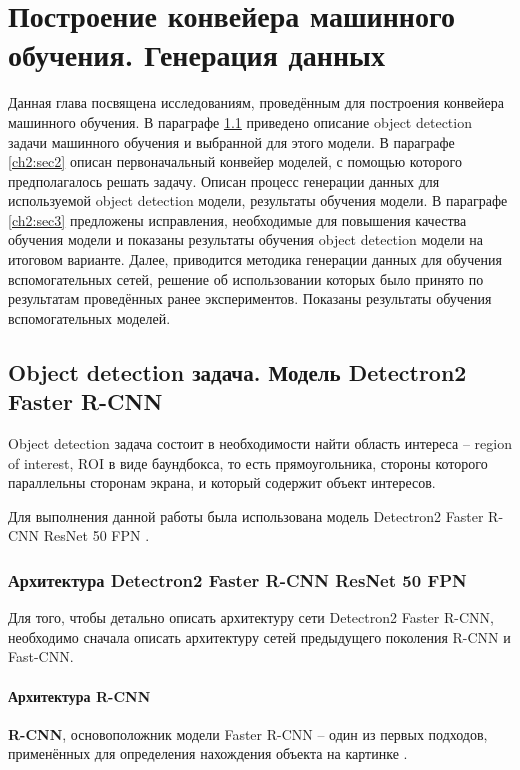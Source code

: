 \chapter{Построение конвейера машинного обучения. Генерация данных} \label{ch2}

Данная глава посвящена исследованиям, проведённым для построения конвейера машинного обучения. В параграфе \ref{ch2:sec1} приведено описание object detection задачи машинного обучения и выбранной для этого модели. В параграфе \ref{ch2:sec2} описан первоначальный конвейер моделей, с помощью которого предполагалось решать задачу. Описан процесс генерации данных для используемой object detection модели, результаты обучения модели. В параграфе \ref{ch2:sec3} предложены исправления, необходимые для повышения качества обучения модели и  показаны результаты обучения object detection модели на итоговом варианте. Далее, приводится методика генерации данных для обучения вспомогательных сетей, решение об использовании которых было принято по результатам проведённых ранее экспериментов. Показаны результаты обучения вспомогательных моделей.

\section{Object detection задача. Модель Detectron2 Faster R-CNN} \label{ch2:sec1}

Object detection задача состоит в необходимости найти область интереса -- region of interest, ROI в виде баундбокса, то есть прямоугольника, стороны которого параллельны сторонам экрана, и который содержит объект интересов.

Для выполнения данной работы была использована модель Detectron2 Faster R-CNN ResNet 50 FPN \cite{detectron}.

\subsection{Архитектура Detectron2 Faster R-CNN ResNet 50 FPN}

Для того, чтобы детально описать архитектуру сети Detectron2 Faster R-CNN, необходимо сначала описать архитектуру сетей предыдущего поколения R-CNN и Fast-CNN.

\subsubsection{Архитектура R-CNN}

\textbf{R-CNN}, основоположник модели Faster R-CNN -- один из первых подходов, применённых для определения нахождения объекта на картинке \cite{rcnn}.

